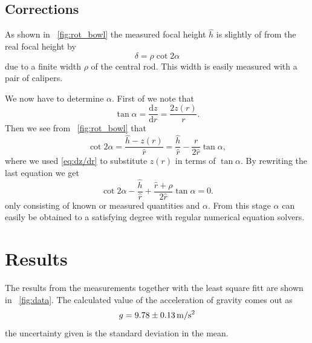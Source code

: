 \documentclass[11pt,towcolumn, swedish, english]{article}
\newcommand{\rd}{\ensuremath{\mathrm{d}}}
\newcommand{\figref}{\figurename~\ref}
\begin{document}
\subsection{Corrections}\label{sec:corrections}
As shown in \figref{fig:rot_bowl} the measured focal height
$\hat{h}$ is slightly of from the real focal height by 
\begin{equation*}%
\delta=\rho\cot 2\alpha
\end{equation*}
due to a finite width $\rho$ of the central rod. This width is easily
measured with a pair of calipers.

We now have to determine $\alpha$. First of we note that
\begin{equation}\label{eq:dz/dr}
\tan\alpha=\frac{\rd z}{\rd r}=\frac{2 z(r)}{r}.
\end{equation}
Then we see from \figref{fig:rot_bowl} that 
\begin{equation*}
\cot 2\alpha =\frac{\hat{h} - z(r)}{\hat{r}} 
= \frac{\hat{h}}{\hat{r}}-\frac{r}{2\hat{r}}\tan\alpha,
\end{equation*}
where we used \eqref{eq:dz/dr} to substitute $z(r)$ in terms of
$\tan\alpha$. By rewriting the last equation we get
\begin{equation*}
\cot 2\alpha 
-\frac{\hat{h}}{\hat{r}}
+\frac{\hat{r}+\rho}{2\hat{r}}\tan\alpha  = 0.
\end{equation*}
only consisting of known or measured quantities and $\alpha$. From
this stage $\alpha$ can easily be obtained to a satisfying degree with
regular numerical equation solvers.

\section{Results}
The results from the measurements together with the least square fitt
are shown in \figref{fig:data}. The calculated value of the
acceleration of gravity comes out as
\begin{equation*}
g=\unit[9.78\pm 0.13]{m/s^2}
\end{equation*}
the uncertainty given is the standard deviation in the mean.
\end{document}
